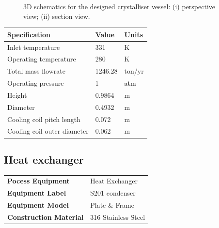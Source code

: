 \begin{figure}[H]
    \centering
    
    \caption{3D schematics for the designed crystalliser vessel: (i) perspective view; (ii) section view.}
    \label{fig:schematic crystalliser process design data sheet}
\end{figure}

\begin{table}[H]
\centering
\begin{tabular}{@{}l|l|l@{}}
\toprule
\textbf{Specification}                  & \textbf{Value} & \textbf{Units}    \\ \midrule
Inlet temperature                       & 331             & K                \\ \midrule
Operating temperature                   & 280             & K                \\ \midrule
Total mass flowrate                     & 1246.28         & ton/yr             \\ \midrule
Operating pressure                      & 1               & atm               \\ \midrule
Height                                  & 0.9864          & m                 \\ \midrule
Diameter                                & 0.4932          & m                 \\ \midrule
Cooling coil pitch length               & 0.072           & m                 \\ \midrule
Cooling coil outer diameter             & 0.062           & m                  \\ \bottomrule
\end{tabular}
\end{table}

\newpage
\subsection{Heat exchanger}

\begin{table}[H]
    \centering
    \begin{tabular}{@{}l|l@{}}
    \toprule
    \textbf{Pocess Equipment}      & Heat Exchanger      \\
    \textbf{Equipment Label}       & S201 condenser      \\
    \textbf{Equipment Model}       & Plate   \& Frame    \\
    \textbf{Construction Material} & 316 Stainless Steel \\ \bottomrule
    \end{tabular}
\end{table}

